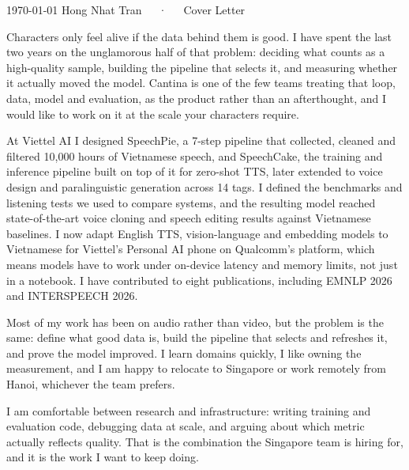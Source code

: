 \documentclass[11pt, a4paper]{awesome-cv}
\begin{document}
\makecvheader[C]

\makecvfooter
  {\today}
  {Hong Nhat Tran~~~·~~~Cover Letter}
  {}

\makelettertitle


\begin{cvletter}

Characters only feel alive if the data behind them is good. I have spent the last two years on the unglamorous half of that problem: deciding what counts as a high-quality sample, building the pipeline that selects it, and measuring whether it actually moved the model. Cantina is one of the few teams treating that loop, data, model and evaluation, as the product rather than an afterthought, and I would like to work on it at the scale your characters require.

At Viettel AI I designed SpeechPie, a 7-step pipeline that collected, cleaned and filtered 10,000 hours of Vietnamese speech, and SpeechCake, the training and inference pipeline built on top of it for zero-shot TTS, later extended to voice design and paralinguistic generation across 14 tags. I defined the benchmarks and listening tests we used to compare systems, and the resulting model reached state-of-the-art voice cloning and speech editing results against Vietnamese baselines. I now adapt English TTS, vision-language and embedding models to Vietnamese for Viettel's Personal AI phone on Qualcomm's platform, which means models have to work under on-device latency and memory limits, not just in a notebook. I have contributed to eight publications, including EMNLP 2026 and INTERSPEECH 2026.

Most of my work has been on audio rather than video, but the problem is the same: define what good data is, build the pipeline that selects and refreshes it, and prove the model improved. I learn domains quickly, I like owning the measurement, and I am happy to relocate to Singapore or work remotely from Hanoi, whichever the team prefers.

I am comfortable between research and infrastructure: writing training and evaluation code, debugging data at scale, and arguing about which metric actually reflects quality. That is the combination the Singapore team is hiring for, and it is the work I want to keep doing.

\end{cvletter}


\makeletterclosing
\end{document}
